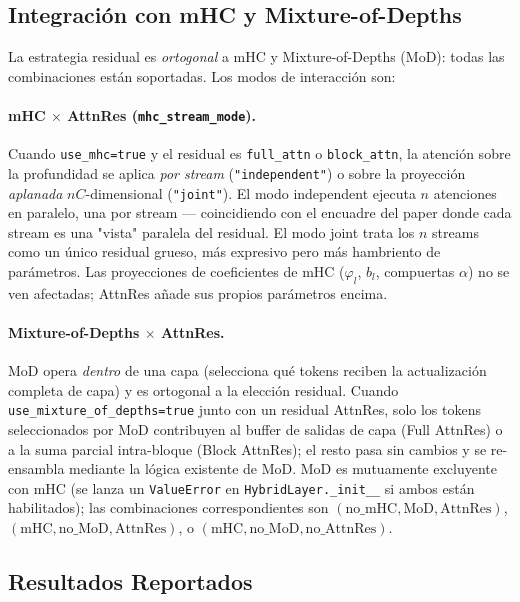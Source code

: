 \subsection{Integración con mHC y Mixture-of-Depths}

La estrategia residual es \emph{ortogonal} a mHC y Mixture-of-Depths
(MoD): todas las combinaciones están soportadas. Los modos de
interacción son:

\paragraph{mHC $\times$ AttnRes (\texttt{mhc\_stream\_mode}).}
Cuando \texttt{use\_mhc=true} y el residual es \texttt{full\_attn} o
\texttt{block\_attn}, la atención sobre la profundidad se aplica
\emph{por stream} (\texttt{"independent"}) o sobre la proyección
\emph{aplanada} $nC$-dimensional (\texttt{"joint"}). El modo
independent ejecuta $n$ atenciones en paralelo, una por stream ---
coincidiendo con el encuadre del paper donde cada stream es una "vista"
paralela del residual. El modo joint trata los $n$ streams como un
único residual grueso, más expresivo pero más hambriento de parámetros.
Las proyecciones de coeficientes de mHC ($\varphi_l$, $b_l$,
compuertas $\alpha$) no se ven afectadas; AttnRes añade sus propios
parámetros encima.

\paragraph{Mixture-of-Depths $\times$ AttnRes.}
MoD opera \emph{dentro} de una capa (selecciona qué tokens reciben la
actualización completa de capa) y es ortogonal a la elección residual.
Cuando \texttt{use\_mixture\_of\_depths=true} junto con un residual
AttnRes, solo los tokens seleccionados por MoD contribuyen al buffer de
salidas de capa (Full AttnRes) o a la suma parcial intra-bloque (Block
AttnRes); el resto pasa sin cambios y se re-ensambla mediante la
lógica existente de MoD. MoD es mutuamente excluyente con mHC (se
lanza un \texttt{ValueError} en \texttt{HybridLayer.\-\_\-init\_\_} si
ambos están habilitados); las combinaciones correspondientes son
$(\text{no\_mHC}, \text{MoD}, \text{AttnRes})$,
$(\text{mHC}, \text{no\_MoD}, \text{AttnRes})$, o
$(\text{mHC}, \text{no\_MoD}, \text{no\_AttnRes})$.

\subsection{Resultados Reportados}

